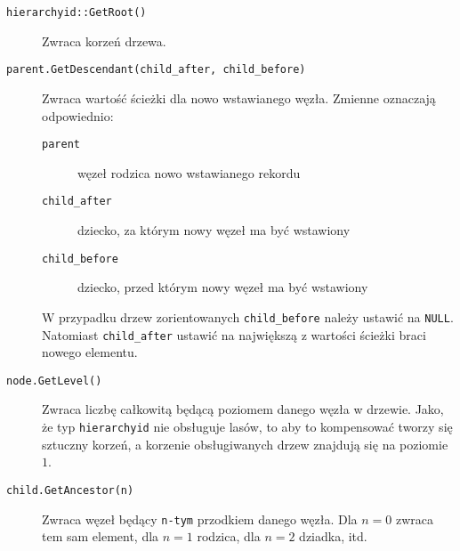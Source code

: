 
\begin{description}
  	\item[\texttt{hierarchyid::GetRoot()}]
  		Zwraca korzeń drzewa.
  	
  \item[\texttt{parent.GetDescendant(child\_after, child\_before)}]
  	Zwraca wartość ścieżki dla nowo wstawianego węzła. 
  	Zmienne oznaczają odpowiednio:
  	\begin{description}
  		\item[\texttt{parent}] węzeł rodzica nowo wstawianego rekordu
  		\item[\texttt{child\_after}] dziecko, za którym nowy węzeł ma być wstawiony 
  		\item[\texttt{child\_before}] dziecko, przed którym nowy węzeł ma być wstawiony 
  	\end{description}
	
	W przypadku drzew zorientowanych \texttt{child\_before} należy ustawić na \texttt{NULL}.
	Natomiast \texttt{child\_after} ustawić na największą z wartości ścieżki braci nowego elementu.
  	
%

  \item[\texttt{node.GetLevel()}]
	Zwraca liczbę całkowitą będącą poziomem danego węzła w drzewie. 
	Jako, że typ \texttt{hierarchyid} nie obsługuje lasów, to aby to kompensować tworzy się sztuczny korzeń, a korzenie obsługiwanych drzew znajdują się na poziomie $1$.

	\item[\texttt{child.GetAncestor(n)}]
    	Zwraca węzeł będący \texttt{n-tym} przodkiem danego węzła.
    	Dla $n = 0$ zwraca tem sam element, dla $n = 1$ rodzica, dla $n = 2$ dziadka, itd.




\end{description}
